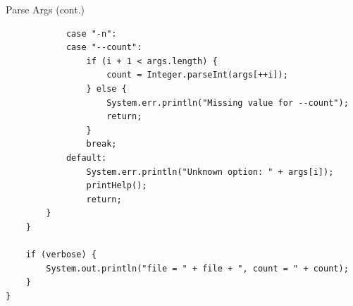 \documentclass[aspectratio=43,10pt,t]{beamer}
\begin{document}
\begin{frame}[fragile]{Parse Args (cont.)}
\begin{lstlisting}
            case "-n":
            case "--count":
                if (i + 1 < args.length) {
                    count = Integer.parseInt(args[++i]);
                } else {
                    System.err.println("Missing value for --count");
                    return;
                }
                break;
            default:
                System.err.println("Unknown option: " + args[i]);
                printHelp();
                return;
        }
    }

    if (verbose) {
        System.out.println("file = " + file + ", count = " + count);
    }
}
\end{lstlisting}
\end{frame}
\end{document}
